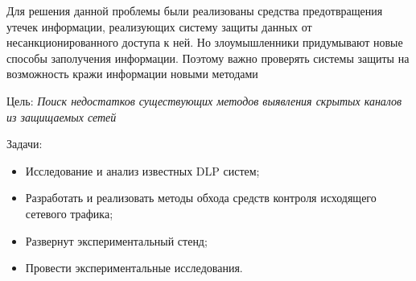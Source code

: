 Для решения данной проблемы были реализованы средства предотвращения утечек информации, реализующих систему защиты данных от несанкционированного доступа к ней. Но злоумышленники придумывают новые способы заполучения информации. Поэтому важно проверять системы защиты на возможность кражи информации новыми методами

Цель: \textit{Поиск недостатков существующих методов выявления скрытых каналов из защищаемых сетей}
	
Задачи:

\begin{itemize}
	\item
		Исследование и анализ известных DLP систем;
	\item
		Разработать и реализовать методы обхода средств контроля исходящего сетевого трафика;
	\item
		Развернут экспериментальный стенд;
	\item
		Провести экспериментальные исследования.
\end{itemize}

	